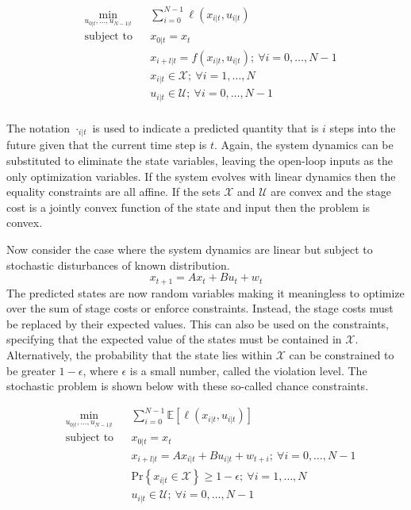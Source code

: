 \documentclass[12 pt]{report}
\begin{document}
\begin{equation*}
\begin{aligned}
& \min_{u_{0|t}, \dots, u_{N-1|t}} & & \sum_{i = 0}^{N-1} \ell (x_{i|t}, u_{i|t}) \\
& \text{subject to} & & x_{0|t} = x_t \\
& & & x_{i+l|t} = f(x_{i|t}, u_{i|t}); ~ \forall i = 0, \dots, N-1 \\
& & & x_{i|t} \in \mathcal{X}; ~ \forall i = 1, \dots, N \\
& & & u_{i|t} \in \mathcal{U}; ~ \forall i = 0, \dots, N-1 \\
\end{aligned}
\end{equation*}

The notation $\cdot_{i|t}$ is used to indicate a predicted quantity that is $i$ steps into the future given that the current time step is $t$. Again, the system dynamics can be substituted to eliminate the state variables, leaving the open-loop inputs as the only optimization variables. If the system evolves with linear dynamics then the equality constraints are all affine. If the sets $\mathcal{X}$ and $\mathcal{U}$ are convex and the stage cost is a jointly convex function of the state and input then the problem is convex.

Now consider the case where the system dynamics are linear but subject to stochastic disturbances of known distribution. $$ x_{t+1} = Ax_t + Bu_t + w_t $$ The predicted states are now random variables making it meaningless to optimize over the sum of stage costs or enforce constraints. Instead, the stage costs must be replaced by their expected values. This can also be used on the constraints, specifying that the expected value of the states must be contained in $\mathcal{X}$. Alternatively, the probability that the state lies within $\mathcal{X}$ can be constrained to be greater $1 - \epsilon$, where $\epsilon$ is a small number, called the violation level. The stochastic problem is shown below with these so-called chance constraints.

\begin{equation*}
\begin{aligned}
& \min_{u_{0|t}, \dots, u_{N-1|t}} & & \sum_{i = 0}^{N-1} \mathbb{E} \left[ \ell (x_{i|t}, u_{i|t}) \right] \\
& \text{subject to} & & x_{0|t} = x_t \\
& & & x_{i+l|t} = Ax_{i|t} + Bu_{i|t} + w_{t+i}; ~ \forall i = 0, \dots, N-1 \\
& & & \mathrm{Pr} \left\{ x_{i|t} \in \mathcal{X}  \right\} \geq 1 - \epsilon; ~ \forall i = 1, \dots, N \\
& & & u_{i|t} \in \mathcal{U}; ~ \forall i = 0, \dots, N-1 \\
\end{aligned}
\end{equation*}
\end{document}
